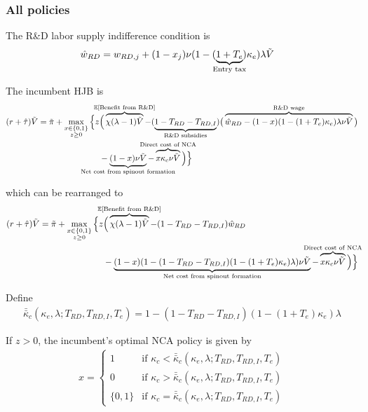 \documentclass[11pt,english]{article}
\begin{document}
\subsubsection{All policies}\label{appendix:model:efficiencyderivations:allPolicies}

The R\&D labor supply indifference condition is
\begin{align}
\hat{w}_{RD} &= w_{RD,j} + (1-x_j) \nu (1-(\underbrace{1+T_e}_{\mathclap{\text{Entry tax}}})\kappa_e) \lambda \tilde{V} \label{eq:RD_worker_indifference_all}
\end{align}

The incumbent HJB is
\begin{align}
(r + \hat{\tau}) \tilde{V} = \tilde{\pi} + \max_{\substack{x \in \{0,1\} \\ z \ge 0}} \Big\{z &\Big( \overbrace{\chi (\lambda - 1) \tilde{V}}^{\mathclap{\mathbb{E}[\textrm{Benefit from R\&D}]}}-  (\underbrace{1 - T_{RD} - T_{RD,I}}_{\mathclap{\text{R\&D subsidies}}})\big( \overbrace{\hat{w}_{RD} - (1-x)(1-(1+T_e)\kappa_e)\lambda \nu \tilde{V}}^{\mathclap{\text{R\&D wage}}}\big) \label{eq:hjb_incumbent_all} \nonumber \\ 
&-  \underbrace{(1-x) \nu \tilde{V}}_{\mathclap{\text{Net cost from spinout formation}}} - \overbrace{x \kappa_{c} \nu \tilde{V}}^{\mathclap{\text{Direct cost of NCA}}}\Big) \Big\} 
\end{align}

which can be rearranged to
\begin{align}
(r + \hat{\tau}) \tilde{V} = \tilde{\pi} + \max_{\substack{x \in \{0,1\} \\ z \ge 0}} \Big\{z &\Big( \overbrace{\chi (\lambda - 1) \tilde{V}}^{\mathclap{\mathbb{E}[\textrm{Benefit from R\&D}]}}- (1-T_{RD}- T_{RD,I})\hat{w}_{RD} \\
&-  \underbrace{(1-x)(1 - (1-T_{RD} - T_{RD,I})(1-(1+T_e)\kappa_{e})\lambda)\nu \tilde{V}}_{\mathclap{\text{Net cost from spinout formation}}} - \overbrace{x \kappa_{c}\nu \tilde{V}}^{\mathclap{\text{Direct cost of NCA}}}\Big) \Big\} \label{eq:hjb_incumbent_all_2}
\end{align}

Define
\begin{align}
\bar{\bar{\kappa}}_c(\kappa_e,\lambda;T_{RD},T_{RD,I},T_e) = 1 - (1-T_{RD} - T_{RD,I})(1-(1+T_e)\kappa_e)\lambda  \label{eq:barkappa_all}
\end{align} 

If $z > 0$, the incumbent's optimal NCA policy is given by 
\begin{align}
x = \begin{cases}
1 & \textrm{if } \kappa_c < \bar{\bar{\kappa}}_c (\kappa_e, \lambda;T_{RD},T_{RD,I},T_e)\\
0 & \textrm{if } \kappa_c > \bar{\bar{\kappa}}_c (\kappa_e, \lambda;T_{RD},T_{RD,I},T_e)\\
\{0,1\} & \textrm{if } \kappa_c = \bar{\bar{\kappa}}_c (\kappa_e, \lambda;T_{RD},T_{RD,I},T_e)
\end{cases} \label{eq:nca_policy_all}
\end{align}
\end{document}
